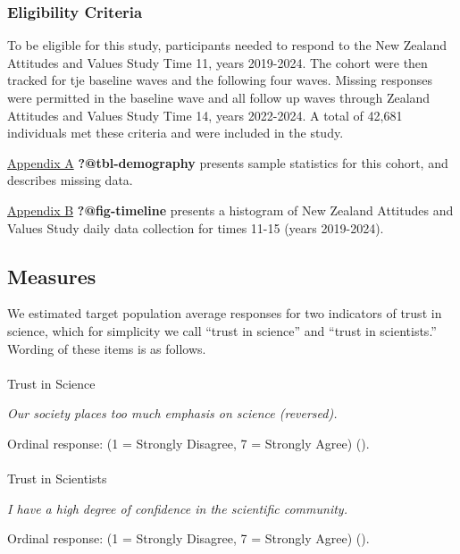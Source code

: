 \documentclass[
  single column]{article}
\makeatletter
\let\oldparagraph\paragraph
\renewcommand{\paragraph}{
    \@ifstar
      \xxxParagraphStar
      \xxxParagraphNoStar
  }
\newcommand{\xxxParagraphStar}[1]{\oldparagraph*{#1}\mbox{}}
\newcommand{\xxxParagraphNoStar}[1]{\oldparagraph{#1}\mbox{}}
\makeatother
\begin{document}
\subsubsection{Eligibility Criteria}\label{eligibility-criteria}

To be eligible for this study, participants needed to respond to the New
Zealand Attitudes and Values Study Time 11, years 2019-2024. The cohort
were then tracked for tje baseline waves and the following four waves.
Missing responses were permitted in the baseline wave and all follow up
waves through Zealand Attitudes and Values Study Time 14, years
2022-2024. A total of 42,681 individuals met these criteria and were
included in the study.

\hyperref[appendix-a]{Appendix A} \textbf{?@tbl-demography} presents
sample statistics for this cohort, and describes missing data.

\hyperref[appendix-b]{Appendix B} \textbf{?@fig-timeline} presents a
histogram of New Zealand Attitudes and Values Study daily data
collection for times 11-15 (years 2019-2024).

\subsection{Measures}\label{measures}

We estimated target population average responses for two indicators of
trust in science, which for simplicity we call ``trust in science'' and
``trust in scientists.'' Wording of these items is as follows.

\paragraph{Trust in Science}\label{trust-in-science}

\emph{Our society places too much emphasis on science (reversed).}

Ordinal response: (1 = Strongly Disagree, 7 = Strongly Agree)
().

\paragraph{Trust in Scientists}\label{trust-in-scientists}

\emph{I have a high degree of confidence in the scientific community.}

Ordinal response: (1 = Strongly Disagree, 7 = Strongly Agree)
().
\end{document}
